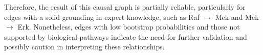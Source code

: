 \documentclass{article}
\begin{document}
Therefore, the result of this causal graph is partially reliable, particularly for edges with a solid grounding in expert knowledge, such as Raf $\rightarrow$ Mek and Mek $\rightarrow$ Erk. Nonetheless, edges with low bootstrap probabilities and those not supported by biological pathways indicate the need for further validation and possibly caution in interpreting these relationships.
\end{document}
